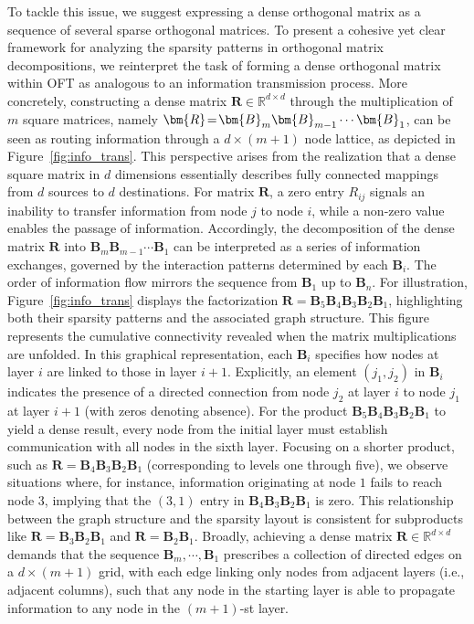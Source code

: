 To tackle this issue, we suggest expressing a dense orthogonal matrix as a sequence of several sparse orthogonal matrices. To present a cohesive yet clear framework for analyzing the sparsity patterns in orthogonal matrix decompositions, we reinterpret the task of forming a dense orthogonal matrix within OFT as analogous to an information transmission process. More concretely, constructing a dense matrix $\bm{R}\in\mathbb{R}^{d\times d}$ through the multiplication of $m$ square matrices, namely $\thickmuskip=2mu \medmuskip=2mu \bm{R}=\bm{B}_m\bm{B}_{m-1}\cdots\bm{B}_1$, can be seen as routing information through a $d\times (m+1)$ node lattice, as depicted in Figure~\ref{fig:info_trans}. This perspective arises from the realization that a dense square matrix in $d$ dimensions essentially describes fully connected mappings from $d$ sources to $d$ destinations. For matrix $\bm{R}$, a zero entry $R_{ij}$ signals an inability to transfer information from node $j$ to node $i$, while a non-zero value enables the passage of information. Accordingly, the decomposition of the dense matrix $\bm{R}$ into $\bm{B}_m\bm{B}_{m-1}\cdots\bm{B}_1$ can be interpreted as a series of information exchanges, governed by the interaction patterns determined by each $\bm{B}_i$. The order of information flow mirrors the sequence from $\bm{B}_1$ up to $\bm{B}_n$. For illustration, Figure~\ref{fig:info_trans} displays the factorization $\bm{R}=\bm{B}_5\bm{B}_4\bm{B}_3\bm{B}_2\bm{B}_1$, highlighting both their sparsity patterns and the associated graph structure. This figure represents the cumulative connectivity revealed when the matrix multiplications are unfolded. In this graphical representation, each $\bm{B}_i$ specifies how nodes at layer $i$ are linked to those in layer $i+1$. Explicitly, an element $(j_1,j_2)$ in $\bm{B}_i$ indicates the presence of a directed connection from node $j_2$ at layer $i$ to node $j_1$ at layer $i+1$ (with zeros denoting absence). For the product $\bm{B}_5\bm{B}_4\bm{B}_3\bm{B}_2\bm{B}_1$ to yield a dense result, every node from the initial layer must establish communication with all nodes in the sixth layer. Focusing on a shorter product, such as $\bm{R}=\bm{B}_4\bm{B}_3\bm{B}_2\bm{B}_1$ (corresponding to levels one through five), we observe situations where, for instance, information originating at node $1$ fails to reach node $3$, implying that the $(3,1)$ entry in $\bm{B}_4\bm{B}_3\bm{B}_2\bm{B}_1$ is zero. This relationship between the graph structure and the sparsity layout is consistent for subproducts like $\bm{R}=\bm{B}_3\bm{B}_2\bm{B}_1$ and $\bm{R}=\bm{B}_2\bm{B}_1$. Broadly, achieving a dense matrix $\bm{R}\in\mathbb{R}^{d\times d}$ demands that the sequence $\bm{B}_m,\cdots,\bm{B}_1$ prescribes a collection of directed edges on a $d\times (m+1)$ grid, with each edge linking only nodes from adjacent layers (i.e., adjacent columns), such that any node in the starting layer is able to propagate information to any node in the $(m+1)$-st layer.

